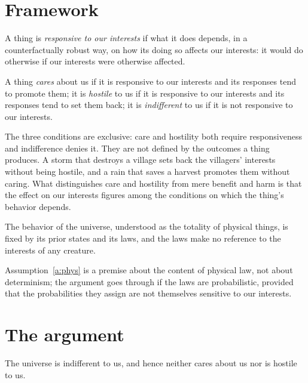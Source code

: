 \documentclass{situationist-preprint}
\begin{document}
\section{Framework}

\begin{definition}[Responsiveness]\label{d:resp}
A thing is \emph{responsive to our interests} if what it does depends, in a counterfactually robust way, on how its doing so affects our interests: it would do otherwise if our interests were otherwise affected.
\end{definition}

\begin{definition}\label{d:attitudes}
A thing \emph{cares} about us if it is responsive to our interests and its responses tend to promote them; it is \emph{hostile} to us if it is responsive to our interests and its responses tend to set them back; it is \emph{indifferent} to us if it is not responsive to our interests.
\end{definition}

The three conditions are exclusive: care and hostility both require responsiveness and indifference denies it. They are not defined by the outcomes a thing produces. A storm that destroys a village sets back the villagers' interests without being hostile, and a rain that saves a harvest promotes them without caring. What distinguishes care and hostility from mere benefit and harm is that the effect on our interests figures among the conditions on which the thing's behavior depends.

\begin{assumption}\label{a:phys}
The behavior of the universe, understood as the totality of physical things, is fixed by its prior states and its laws, and the laws make no reference to the interests of any creature.
\end{assumption}

Assumption~\ref{a:phys} is a premise about the content of physical law, not about determinism; the argument goes through if the laws are probabilistic, provided that the probabilities they assign are not themselves sensitive to our interests.

\section{The argument}

\begin{theorem}\label{t:indiff}
The universe is indifferent to us, and hence neither cares about us nor is hostile to us.
\end{theorem}
\end{document}

